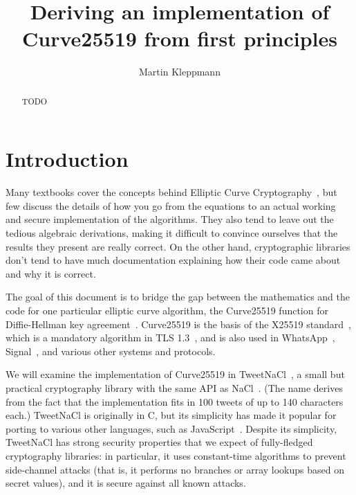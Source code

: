 \documentclass{article}
\begin{document}
\def\listingautorefname{Listing}%
\def\sectionautorefname{Section}%
\def\subsectionautorefname{Section}%
\def\subsubsectionautorefname{Section}%

\title{Deriving an implementation of Curve25519 from first principles}
\author{Martin Kleppmann}
\date{}
\maketitle
\begin{abstract}
TODO
\end{abstract}

\section{Introduction}

Many textbooks cover the concepts behind Elliptic Curve Cryptography~\cite{Cohen:2006,Hankerson:2004}, but few discuss the details of how you go from the equations to an actual working and secure implementation of the algorithms.
They also tend to leave out the tedious algebraic derivations, making it difficult to convince ourselves that the results they present are really correct.
On the other hand, cryptographic libraries don't tend to have much documentation explaining how their code came about and why it is correct.

The goal of this document is to bridge the gap between the mathematics and the code for one particular elliptic curve algorithm, the Curve25519 function for Diffie-Hellman key agreement~\cite{Bernstein:2006kw}.
Curve25519 is the basis of the X25519 standard~\cite{X25519}, which is a mandatory algorithm in TLS 1.3~\cite{TLS13}, and is also used in WhatsApp~\cite{WhatsAppWhitepaper}, Signal~\cite{Marlinspike:2016}, and various other systems and protocols.

We will examine the implementation of Curve25519 in TweetNaCl~\cite{Bernstein:2014ca,TweetNaCl}, a small but practical cryptography library with the same API as NaCl~\cite{NaCl,Bernstein:2012}.
(The name derives from the fact that the implementation fits in 100 tweets of up to 140 characters each.)
TweetNaCl is originally in C, but its simplicity has made it popular for porting to various other languages, such as JavaScript~\cite{TweetNaCljs}.
Despite its simplicity, TweetNaCl has strong security properties that we expect of fully-fledged cryptography libraries: in particular, it uses constant-time algorithms to prevent side-channel attacks (that is, it performs no branches or array lookups based on secret values), and it is secure against all known attacks.
\end{document}
